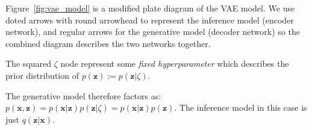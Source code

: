 \documentclass[11pt, a4paper]{report}
\theoremstyle{plain}
\theoremstyle{definition}
\theoremstyle{remark}
\newcommand{\x}{\mathbf{x}}
\newcommand{\z}{\mathbf{z}}
\begin{document}
Figure~\ref{fig:vae_model} is a modified plate diagram of the VAE model.
We use doted arrows with round arrowhead to represent the inference model
(encoder network),
and regular arrows for the generative model (decoder network) so the combined
diagram describes the two networks together.

The squared $\zeta$ node represent some \emph{fixed hyperparameter} which describes the
prior distribution of $p(\z) := p(\z | \zeta)$.

The generative model therefore factors as: $p(\x,\z) = p(\x|\z)p(\z|\zeta) =
p(\x|\z)p(\z)$.
The inference model in this case is just $q(\z | \x)$.
\end{document}

